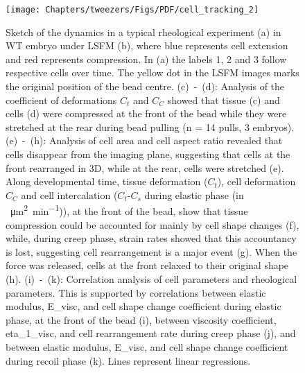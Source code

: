  \begin{figure}
 \centering
  \texttt{[image: Chapters/tweezers/Figs/PDF/cell\_tracking\_2]} %
 \caption[Sketch of the dynamics in a typical rheological experiment]{\footnotemark{}
 Sketch of the dynamics in a typical rheological experiment (a) in \gls{WT} embryo under \gls{LSFM} (b), where blue represents cell extension and red represents compression.
 In (a) the labels 1, 2 and 3 follow respective cells over time.
 The yellow dot in the \gls{LSFM} images marks the original position  of the bead centre.
 (c)~-~(d): Analysis of the coefficient of deformations \(C_t\) and \(C_C\) showed that tissue (c) and cells (d) were compressed at the front  of the bead while they were stretched at the rear during bead  pulling (n = 14 pulls, 3 embryos).
 (e)~-~(h): Analysis of cell area  and cell aspect ratio revealed that cells disappear from the imaging plane, suggesting that cells at the front rearranged in 3D, while at the rear, cells were stretched (e).
 Along developmental time, tissue deformation (\(C_t\)), cell deformation \(C_C\) and cell intercalation (\(C_t\)-\(C_s\) during elastic phase (in \SI{}{\micro\metre\squared\per\minute})), at the front of the bead, show that tissue compression could be accounted for mainly by cell shape changes (f), while, during creep phase, strain rates showed that this accountancy is lost, suggesting cell rearrangement is a major event (g).
 When the force was released, cells at the front relaxed to their original shape (h).
(i)~-~(k): Correlation analysis of cell parameters and rheological parameters.
This is supported by correlations between elastic modulus, \gls{E_visc}, and cell shape change coefficient during elastic phase, at the front of the bead (i), between viscosity coefficient, \gls{eta_1_visc}, and cell rearrangement rate during creep phase (j), and between elastic modulus, \gls{E_visc}, and cell shape change coefficient during recoil phase (k).
Lines represent linear regressions.
}
\end{figure}
